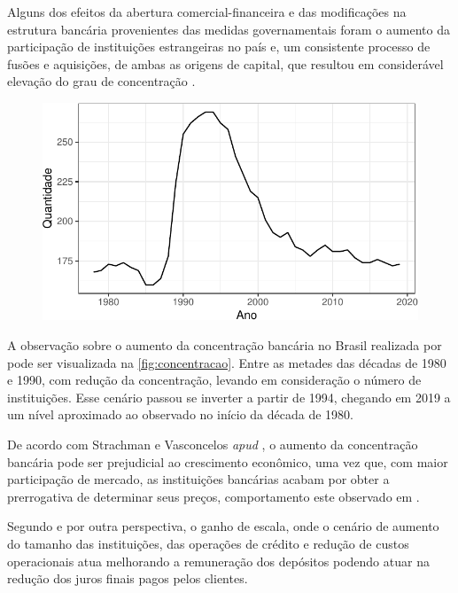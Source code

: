 \documentclass[12pt,openright,oneside,a4paper,chapter=TITLE,section=TITLE,subsection=Title,english,french,spanish,portugues,sumario=tradicional]{04-class-files/abntex2}
\begin{document}
Alguns dos efeitos da abertura comercial-financeira e das modificações na
estrutura bancária provenientes das medidas governamentais foram o aumento da
participação de instituições estrangeiras no país e, um consistente processo de
fusões e aquisições, de ambas as origens de capital, que resultou em
considerável elevação do grau de concentração \cite{camargo:2009}.

\begin{figure}

\begin{center}\includegraphics{12-exportedfigures/concetration-1} \end{center}
\label{fig:concentracao}
\end{figure}

A observação sobre o aumento da concentração bancária no Brasil realizada por
\textcite{camargo:2009} pode ser visualizada na \autoref{fig:concentracao}.
Entre as metades das décadas de 1980 e 1990, com redução da concentração,
levando em consideração o número de instituições. Esse cenário passou se
inverter a partir de 1994, chegando em 2019 a um nível aproximado ao observado
no início da década de 1980.

De acordo com Strachman e Vasconcelos \emph{apud} \textcite{camargo:2009}, o aumento
da concentração bancária pode ser prejudicial ao crescimento econômico, uma vez
que, com maior participação de mercado, as instituições bancárias acabam por
obter a prerrogativa de determinar seus preços, comportamento este observado em
\textcite{klein:1971}.

Segundo \textcite{camargo:2009} e \textcite{dantas:2012} por outra perspectiva,
o ganho de escala, onde o cenário de aumento do tamanho das instituições, das
operações de crédito e redução de custos operacionais atua melhorando a
remuneração dos depósitos podendo atuar na redução dos juros finais pagos pelos
clientes.
\end{document}
